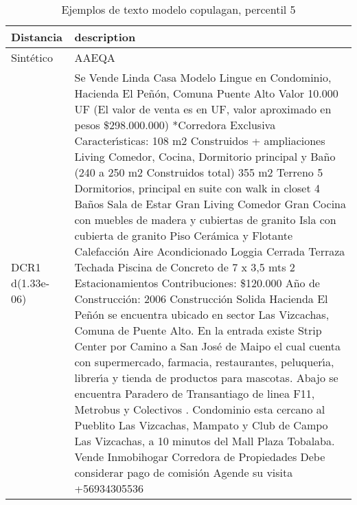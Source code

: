 \begin{table}[H]
\centering
\fontsize{10}{14}\selectfont
\caption{Ejemplos de texto modelo copulagan, percentil 5}
\label{table-example-economicos-a-3-copulagan-5p-text}
\begin{tabular}{|l|m{35em}|}
\hline
\rowcolor[gray]{0.8}
Distancia & description \\
\hline Sintético & AAEQA \\
\hline DCR1 d(1.33e-06) & Se Vende Linda Casa Modelo Lingue en Condominio, Hacienda El Pe\~n\'on, Comuna Puente Alto  Valor 10.000 UF (El valor de venta es en UF, valor aproximado en pesos \$298.000.000) *Corredora Exclusiva  Caracter{\'\i}sticas: 108 m2 Construidos + ampliaciones Living Comedor, Cocina, Dormitorio principal y Ba\~no (240 a 250 m2 Construidos total) 355 m2 Terreno  5 Dormitorios, principal en suite con walk in closet 4 Ba\~nos Sala de Estar Gran Living Comedor Gran Cocina con muebles de madera y cubiertas de granito Isla con cubierta de granito  Piso Cer\'amica y Flotante Calefacci\'on Aire Acondicionado Loggia Cerrada Terraza Techada Piscina de Concreto de 7 x 3,5 mts 2 Estacionamientos  Contribuciones: \$120.000 A\~no de Construcci\'on: 2006 Construcci\'on Solida  Hacienda El Pe\~n\'on se encuentra ubicado en sector Las Vizcachas, Comuna de Puente Alto.  En la entrada existe Strip Center por Camino a San Jos\'e de Maipo el cual cuenta con supermercado, farmacia, restaurantes, peluquer{\'\i}a, librer{\'\i}a y tienda de productos para mascotas.  Abajo se encuentra Paradero de Transantiago de linea F11, Metrobus y Colectivos . Condominio esta cercano al Pueblito Las Vizcachas, Mampato y Club de Campo Las Vizcachas, a 10 minutos del Mall Plaza Tobalaba.  Vende Inmobihogar Corredora de Propiedades Debe considerar pago de comisi\'on  Agende su visita +56934305536 \\

\end{tabular}
\end{table}

